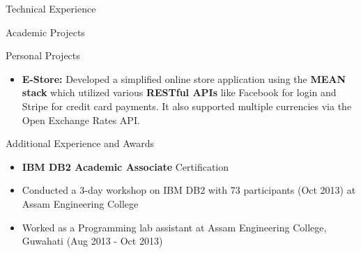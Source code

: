 \documentclass[]{mcdowellcv}
\begin{document}
\begin{cvsection}{Technical Experience}
\begin{cvsubsection}{Academic Projects}{}{}
\begin{itemize}
			\end{itemize}
		\end{cvsubsection}
		\begin{cvsubsection}{Personal Projects}{}{}
			\begin{itemize}
				\item  \textbf{E-Store:} Developed a simplified online store application using the \textbf{MEAN stack} which utilized various \textbf{RESTful APIs} like Facebook for login and Stripe for credit card payments. It also supported multiple currencies via the Open Exchange Rates API.
			\end{itemize}
		\end{cvsubsection}
	\end{cvsection}
	
	\begin{cvsection}{Additional Experience and Awards}
		\begin{cvsubsection}{}{}{}	
			\begin{itemize}
				\item \textbf{IBM DB2 Academic Associate} Certification
				\item Conducted a 3-day workshop on IBM DB2 with 73 participants (Oct 2013) at Assam Engineering College
				\item Worked as a Programming lab assistant at Assam Engineering College, Guwahati (Aug 2013 - Oct 2013)
			\end{itemize}
		\end{cvsubsection}
	\end{cvsection}
	
	
\end{document}
